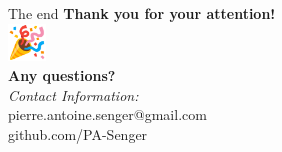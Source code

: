 \documentclass[10pt]{beamer}
\begin{document}
\begin{frame}{The end}
    \Large
    \centering
    \textbf{Thank you for your attention!} \\
    \vspace{1em}
    \includegraphics[height=1cm]{images/party-emoji.png} \\
    \vspace{1em}
    \textbf{Any questions?} \\
    \vspace{2em}
    \small
    \textit{Contact Information:} \\
    pierre.antoine.senger@gmail.com \\
    github.com/PA-Senger
\end{frame}

\nocite{*}


\end{document}
